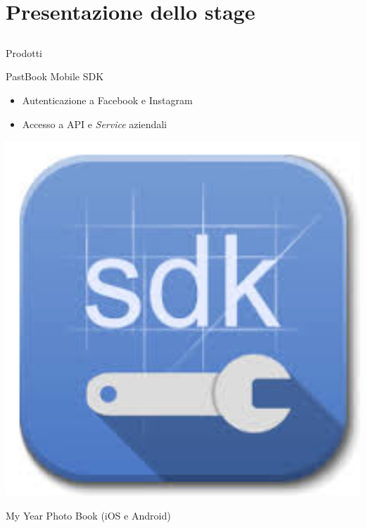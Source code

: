 \section{Presentazione dello stage}
	\subsection{}
		\begin{frame}{Prodotti}
			\begin{minipage}{0.75\textwidth}
				\begin{block}{PastBook Mobile SDK}
					\begin{itemize}
						\item Autenticazione a Facebook e Instagram
						\item Accesso a API e \emph{Service} aziendali
					\end{itemize}
				\end{block}
			\end{minipage}
			\begin{minipage}{0.21\textwidth}
				\includegraphics[width=1.0\textwidth]{capitolo_2/immagini/sdk.png}
			\end{minipage}\par
			\begin{minipage}{0.75\textwidth}
				\begin{block}{My Year Photo Book (iOS e Android)}

\end{block}
\end{minipage}
\end{frame}

